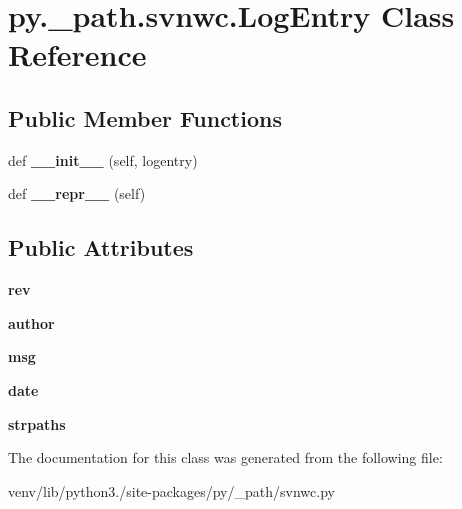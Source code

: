 \hypertarget{classpy_1_1__path_1_1svnwc_1_1_log_entry}{}\section{py.\+\_\+path.\+svnwc.\+Log\+Entry Class Reference}
\label{classpy_1_1__path_1_1svnwc_1_1_log_entry}
\subsection*{Public Member Functions}
\begin{DoxyCompactItemize}
\item 
\mbox{\label{classpy_1_1__path_1_1svnwc_1_1_log_entry_af80526dbd1c60c220fafdc0bdff1a9bb}} 
def {\bfseries \+\_\+\+\_\+init\+\_\+\+\_\+} (self, logentry)
\item 
\mbox{\label{classpy_1_1__path_1_1svnwc_1_1_log_entry_afae5acad41fdec8791423375bc1a726c}} 
def {\bfseries \+\_\+\+\_\+repr\+\_\+\+\_\+} (self)
\end{DoxyCompactItemize}
\subsection*{Public Attributes}
\begin{DoxyCompactItemize}
\item 
\mbox{\label{classpy_1_1__path_1_1svnwc_1_1_log_entry_a5553bdd992b3d20f99ea2c44afd8cc9f}} 
{\bfseries rev}
\item 
\mbox{\label{classpy_1_1__path_1_1svnwc_1_1_log_entry_af95f3d81fbac06a0942d42bca8492680}} 
{\bfseries author}
\item 
\mbox{\label{classpy_1_1__path_1_1svnwc_1_1_log_entry_a197696be3c2ef764c59b97ad170da8f8}} 
{\bfseries msg}
\item 
\mbox{\label{classpy_1_1__path_1_1svnwc_1_1_log_entry_a637302a6117e8a4ed4c8121845231a45}} 
{\bfseries date}
\item 
\mbox{\label{classpy_1_1__path_1_1svnwc_1_1_log_entry_a2419ce82cae9df50db92adddb3e2fe54}} 
{\bfseries strpaths}
\end{DoxyCompactItemize}


The documentation for this class was generated from the following file\+:\begin{DoxyCompactItemize}
\item 
venv/lib/python3./site-\/packages/py/\+\_\+path/svnwc.\+py\end{DoxyCompactItemize}
